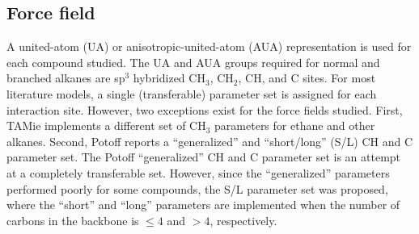 \documentclass[journal=jctc,manuscript=article]{achemso}
\begin{document}

\subsection{Force field} \label{Force Field}

A united-atom (UA) or anisotropic-united-atom (AUA) representation is used for each compound studied. The UA and AUA groups required for normal and branched alkanes are sp$^3$ hybridized CH$_3$, CH$_2$, CH, and C sites. For most literature models, a single (transferable) parameter set is assigned for each interaction site. However, two exceptions exist for the force fields studied. First, TAMie implements a different set of CH$_3$ parameters for ethane and other alkanes. Second, Potoff reports a ``generalized'' and ``short/long'' (S/L) CH and C parameter set. The Potoff ``generalized'' CH and C parameter set is an attempt at a completely transferable set. However, since the ``generalized'' parameters performed poorly for some compounds, the S/L parameter set was proposed, where the ``short'' and ``long'' parameters are implemented when the number of carbons in the backbone is $\le 4$ and $> 4$, respectively. 
\end{document}
